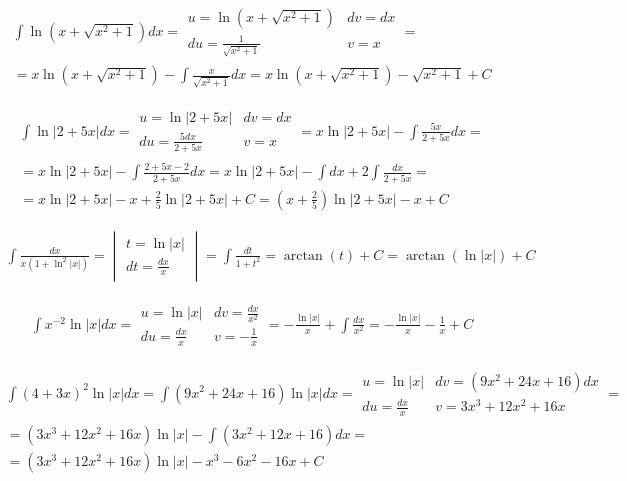 
\begin{gather*}\int \ln(x+\sqrt{x^2+1})dx = \begin{array}{|ll|}
u=\ln(x+\sqrt{x^2+1}) & dv=dx \\
du=\frac{1}{\sqrt{x^2+1}} & v=x \end{array} = \\ = x\ln(x+\sqrt{x^2+1})-\int \frac{x}{\sqrt{x^2+1}}dx = x\ln(x+\sqrt{x^2+1})-\sqrt{x^2+1}+C\end{gather*}



\begin{gather*}\int \ln|2+5x|dx = \begin{array}{|ll|}
u=\ln|2+5x| & dv=dx \\
du=\frac{5dx}{2+5x} & v=x
\end{array} = x\ln|2+5x|-\int \frac{5x}{2+5x}dx = \\ = x\ln|2+5x|-\int \frac{2+5x-2}{2+5x}dx = x\ln|2+5x|-\int dx + 2\int \frac{dx}{2+5x} = \\ = x\ln|2+5x|-x+\frac{2}{5}\ln|2+5x|+C = (x+\frac{2}{5})\ln|2+5x|-x+C\end{gather*}



\begin{gather*}\int \frac{dx}{x(1+\ln^2|x|)} = \begin{vmatrix} t=\ln|x| \\ dt=\frac{dx}{x} \end{vmatrix} = \int \frac{dt}{1+t^2} = \arctan (t) +C = \arctan (\ln|x|) + C \end{gather*}



\begin{gather*}\int x^{-2}\ln|x|dx = \begin{array}{|ll|}
u=\ln|x| & dv=\frac{dx}{x^2} \\
du=\frac{dx}{x} & v=-\frac{1}{x} \end{array} = -\frac{\ln|x|}{x}+\int \frac{dx}{x^2} = -\frac{\ln|x|}{x}-\frac{1}{x}+C\end{gather*}



\begin{gather*}\int (4+3x)^2\ln|x|dx =\int(9x^2+24x+16)\ln|x|dx = \begin{array}{|ll|}
u=\ln|x| & dv=(9x^2+24x+16)dx \\
du=\frac{dx}{x} & v=3x^3+12x^2+16x \end{array} = \\ = (3x^3+12x^2+16x)\ln|x|-\int (3x^2+12x+16)dx = \\ = (3x^3+12x^2+16x)\ln|x|-x^3-6x^2-16x+C\end{gather*}


